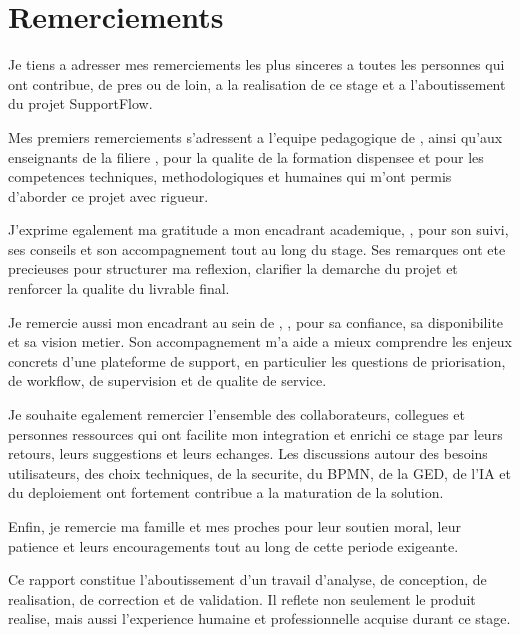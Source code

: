 ﻿\chapter*{Remerciements}

Je tiens a adresser mes remerciements les plus sinceres a toutes les personnes qui ont contribue, de pres ou de loin, a la realisation de ce stage et a l'aboutissement du projet SupportFlow.

Mes premiers remerciements s'adressent a l'equipe pedagogique de \Etablissement, ainsi qu'aux enseignants de la filiere \Specialite, pour la qualite de la formation dispensee et pour les competences techniques, methodologiques et humaines qui m'ont permis d'aborder ce projet avec rigueur.

J'exprime egalement ma gratitude a mon encadrant academique, \EncadrantAcademique, pour son suivi, ses conseils et son accompagnement tout au long du stage. Ses remarques ont ete precieuses pour structurer ma reflexion, clarifier la demarche du projet et renforcer la qualite du livrable final.

Je remercie aussi mon encadrant au sein de \EntrepriseAccueil, \EncadrantEntreprise, pour sa confiance, sa disponibilite et sa vision metier. Son accompagnement m'a aide a mieux comprendre les enjeux concrets d'une plateforme de support, en particulier les questions de priorisation, de workflow, de supervision et de qualite de service.

Je souhaite egalement remercier l'ensemble des collaborateurs, collegues et personnes ressources qui ont facilite mon integration et enrichi ce stage par leurs retours, leurs suggestions et leurs echanges. Les discussions autour des besoins utilisateurs, des choix techniques, de la securite, du BPMN, de la GED, de l'IA et du deploiement ont fortement contribue a la maturation de la solution.

Enfin, je remercie ma famille et mes proches pour leur soutien moral, leur patience et leurs encouragements tout au long de cette periode exigeante.

Ce rapport constitue l'aboutissement d'un travail d'analyse, de conception, de realisation, de correction et de validation. Il reflete non seulement le produit realise, mais aussi l'experience humaine et professionnelle acquise durant ce stage.

